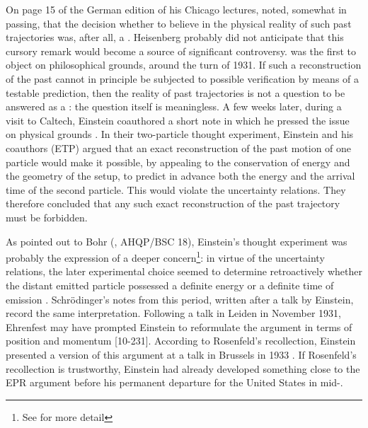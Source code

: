 \documentclass[final,12pt]{article}
\newcommand{\UR}{uncertainty relations\xspace}
\begin{document}
On page 15 of the German edition of his Chicago lectures, \citet{Heisenberg1930} noted, somewhat in passing, that the decision whether to believe in the physical reality of such past trajectories was, after all, a  . Heisenberg probably did not anticipate that this cursory remark would become a source of significant controversy. \citet{Schlick1931} was the first to object on philosophical grounds, around the turn of 1931. If such a reconstruction of the past cannot in principle be subjected to possible verification by means of a testable prediction, then the reality of past trajectories is not a question to be answered as a : the question itself is meaningless. A few weeks later, during a visit to Caltech, Einstein coauthored a short note in which he pressed the issue on physical grounds \citep{Einstein1931-03}. In their two-particle thought experiment, Einstein and his coauthors (ETP) argued that an exact reconstruction of the past motion of one particle would make it possible, by appealing to the conservation of energy and the geometry of the setup, to predict in advance both the energy and the arrival time of the second particle. This would violate the \UR. They therefore concluded that any such exact reconstruction of the past trajectory must be forbidden.

As \Ehr pointed out to Bohr (, AHQP/BSC 18), Einstein's thought experiment was probably the expression of a deeper concern\footnote{See \cite[Ch.~1]{BacciagaluppiCrull2024} for more detail}: in virtue of the \UR, the later experimental choice seemed to determine retroactively whether the distant emitted particle possessed a definite energy or a definite time of emission \autocite[see also][]{Einstein1932d}. Schrödinger's notes from this period, written after a talk by Einstein, record the same interpretation. Following a talk in Leiden in November 1931, Ehrenfest may have prompted Einstein to reformulate the argument in terms of position and momentum [10-231]. According to Rosenfeld's recollection, Einstein presented a version of this argument at a talk in Brussels in 1933 \autocite[127--28]{Rosenfeld1967}. If Rosenfeld's recollection is trustworthy, Einstein had already developed something close to the EPR argument before his permanent departure for the United States in mid-.
\end{document}
